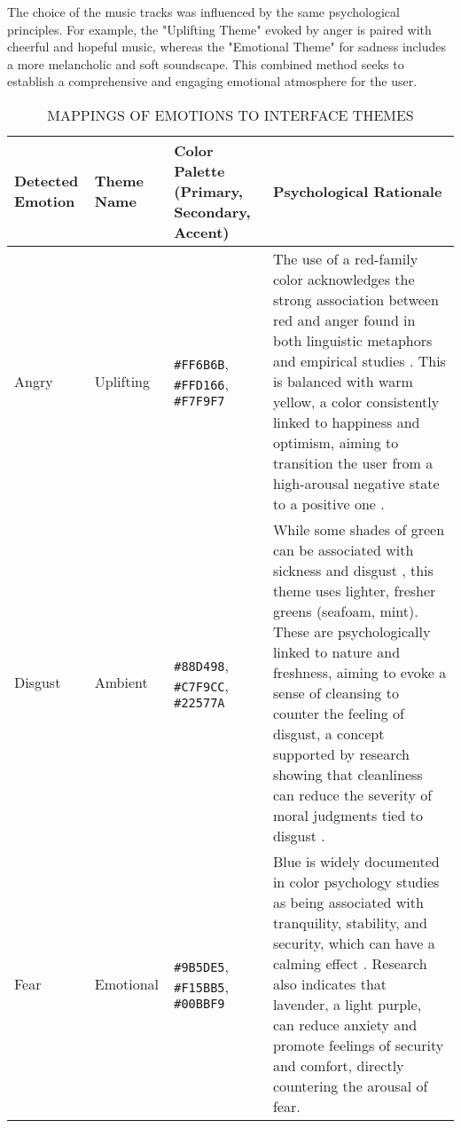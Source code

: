 \documentclass[conference]{IEEEtran}
\begin{document}
	The choice of the music tracks was influenced by the same psychological principles. For example, the "Uplifting Theme" evoked by anger is paired with cheerful and hopeful music, whereas the "Emotional Theme" for sadness includes a more melancholic and soft soundscape. This combined method seeks to establish a comprehensive and engaging emotional atmosphere for the user.
	
	\begin{table*}[t]
		\caption{MAPPINGS OF EMOTIONS TO INTERFACE THEMES}
		\label{tab:theme_mappings}
		\centering
		\begin{tabular}{|p{}|p{}|p{}|p{}|}
			\hline
			\textbf{Detected Emotion} & \textbf{Theme Name} & \textbf{Color Palette (Primary, Secondary, Accent)} & \textbf{Psychological Rationale} \\
			\hline
			Angry & Uplifting & \cellcolor{angryPrimary}\texttt{\#FF6B6B}, \cellcolor{angrySecondary}\texttt{\#FFD166}, \cellcolor{angryAccent}\texttt{\#F7F9F7} &  The use of a red-family color acknowledges the strong association between red and anger found in both linguistic metaphors and empirical studies \cite{b1}. This is balanced with warm yellow, a color consistently linked to happiness and optimism, aiming to transition the user from a high-arousal negative state to a positive one \cite{b2}. \\
			\hline
			Disgust & Ambient & \cellcolor{disgustPrimary}\texttt{\#88D498}, \cellcolor{disgustSecondary}\texttt{\#C7F9CC}, \cellcolor{disgustAccent}\texttt{\#22577A} & While some shades of green can be associated with sickness and disgust \cite{b3}, this theme uses lighter, fresher greens (seafoam, mint). These are psychologically linked to nature and freshness, aiming to evoke a sense of cleansing to counter the feeling of disgust, a concept supported by research showing that cleanliness can reduce the severity of moral judgments tied to disgust \cite{b4}. \\
			\hline
			Fear & Emotional & \cellcolor{fearPrimary}\texttt{\#9B5DE5}, \cellcolor{fearSecondary}\texttt{\#F15BB5}, \cellcolor{fearAccent}\texttt{\#00BBF9} &  Blue is widely documented in color psychology studies as being associated with tranquility, stability, and security, which can have a calming effect \cite{b5}. Research also indicates that lavender, a light purple, can reduce anxiety and promote feelings of security and comfort, directly countering the arousal of fear. \\

\end{tabular}
\end{table*}
\end{document}
